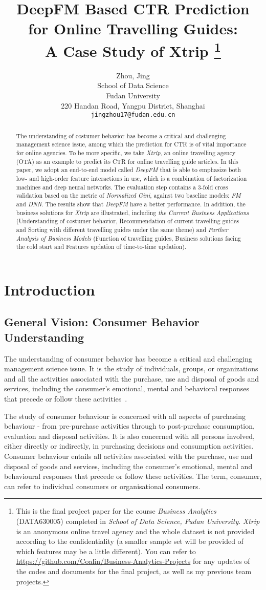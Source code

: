 \documentclass{article}
\title{DeepFM Based CTR Prediction \\
for Online Travelling Guides:\\
A Case Study of Xtrip 
\thanks{This is the final project paper for the course \emph{Business Analytics} (DATA630005) completed in \emph{School of Data Science, Fudan University}. \emph{Xtrip} is an anonymous online travel agency and the whole dataset is not provided according to the confidentiality (a smaller sample set will be provided of which features may be a little different). You can refer to \url{https://github.com/Coalin/Business-Analytics-Projects} for any updates of the codes and documents for the final project, as well as my previous team projects.
}
}
\author{
	Zhou, Jing\\
	School of Data Science\\
	Fudan University\\
	220 Handan Road, Yangpu District, Shanghai\\
	\texttt{jingzhou17@fudan.edu.cn}\\
}
\begin{document}
	
	\maketitle
	\begin{abstract}
		The understanding of costumer behavior has become a critical and challenging management science issue, among which the prediction for CTR is of vital importance for online agencies. To be more specific, we take \emph{Xtrip}, an online travelling agency (OTA) as an example to predict its CTR for online travelling guide articles. In this paper, we adopt an end-to-end model called \emph{DeepFM} that is able to emphasize both low- and high-order feature interactions in use, which is a combination of factorization machines and deep neural networks. The evaluation step contains a 3-fold cross validation based on the metric of \emph{Normalized Gini}, against two baseline models: \emph{FM} and \emph{DNN}. The results show that \emph{DeepFM} have a better performance. In addition, the business solutions for \emph{Xtrip} are illustrated, including \emph{the Current Business Applications} (Understanding of costumer behavior, Recommendation of current travelling guides and Sorting with different travelling guides under the same theme) and \emph{Further Analysis of Business Models} (Function of travelling guides, Business solutions facing the cold start and Features updation of time-to-time updation).
	\end{abstract}
	
	\section{Introduction}
	\label{sec:intro}

	\subsection{General Vision: Consumer Behavior Understanding}
	\label{sec:cbu}	
	The understanding of consumer behavior has become a critical and challenging management science issue. It is the study of individuals, groups, or organizations and all the activities associated with the purchase, use and disposal of goods and services, including the consumer's emotional, mental and behavioral responses that precede or follow these activities~\cite{Hawkins04:Consumer}. 

	The study of consumer behaviour is concerned with all aspects of purchasing behaviour - from pre-purchase activities through to post-purchase consumption, evaluation and disposal activities. It is also concerned with all persons involved, either directly or indirectly, in purchasing decisions and consumption activities. Consumer behaviour entails all activities associated with the purchase, use and disposal of goods and services, including the consumer's emotional, mental and behavioural responses that precede or follow these activities. The term, consumer, can refer to individual consumers or organisational consumers. 
\end{document}
